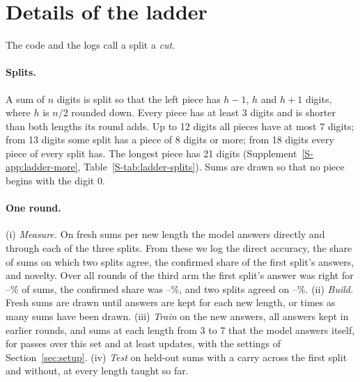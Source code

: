 \section{Details of the ladder}
\label{app:ladder}

\noindent The code and the logs call a split a \emph{cut}.

\paragraph{Splits.} A sum of $n$ digits is split so that the left piece has
$h-1$, $h$ and $h+1$ digits, where $h$ is $n/2$ rounded down. Every piece has
at least 3 digits and is shorter than both lengths its round adds. Up to 12
digits all pieces have at most 7 digits; from 13 digits some split has a
piece of 8 digits or more; from 18 digits every piece of every split has. The
longest piece has 21 digits (Supplement~\ref{S-app:ladder-more},
Table~\ref{S-tab:ladder-splits}). Sums are drawn so that no piece begins with
the digit 0.

\paragraph{One round.} (i) \emph{Measure.} On \gpLadCheckSums{} fresh sums per
new length the model answers directly and through each of the three splits.
From these we log the direct accuracy, the share of sums on which two splits
agree, the confirmed share of the first split's answers, and novelty. Over
all rounds of the third arm the first split's answer was right for
\gpLadCutOneRightLow--\gpLadCutOneRightHigh\% of sums, the confirmed share was
\gpLadConfirmedShareLow--\gpLadConfirmedShareHigh\%, and two splits agreed on
\gpLadAgreedShareLow--\gpLadAgreedShareHigh\%. (ii) \emph{Build.} Fresh sums
are drawn until \gpLadQuota{} answers are kept for each new length, or
\gpLadDrawCapFactor{} times as many sums have been drawn. (iii) \emph{Train}
on the new answers, all answers kept in earlier rounds, and
\gpLadReplayPerLength{} sums at each length from 3 to 7 that the model answers
itself, for \gpLadPasses{} passes over this set and at least \gpLadMinUpdates{}
updates, with the settings of Section~\ref{sec:setup}. (iv) \emph{Test} on
\gpLadTestPerGroup{} held-out sums with a carry across the first split and
\gpLadTestPerGroup{} without, at every length taught so far.

